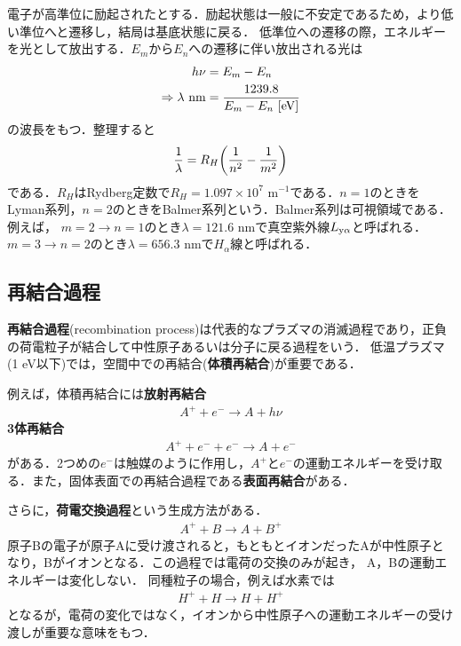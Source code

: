 \documentclass{report}
\begin{document}
      電子が高準位に励起されたとする．励起状態は一般に不安定であるため，より低い準位へと遷移し，結局は基底状態に戻る．
      低準位への遷移の際，エネルギーを光として放出する．$E_m$から$E_n$への遷移に伴い放出される光は
      \begin{align}
        h\nu &= E_m - E_n\\
        \Rightarrow \lambda\ \r{nm} &= \frac{1239.8}{E_m - E_n\ [\r{eV}]}
      \end{align}
      の波長をもつ．整理すると
      \begin{align}
        \frac{1}{\lambda} = R_H\qty(\frac{1}{n^2} - \frac{1}{m^2})
      \end{align}
      である．$R_H$はRydberg定数で$R_H = 1.097 \times 10^7$ m$^{-1}$である．$n=1$のときをLyman系列，$n=2$のときをBalmer系列という．Balmer系列は可視領域である．例えば，
      $m=2\to n=1$のとき$\lambda = 121.6$ nmで真空紫外線$L_{\mathrm{y\alpha}}$と呼ばれる．$m=3\to n=2$のとき$\lambda = 656.3$ nmで$H_{\alpha}$線と呼ばれる．

    \subsection{再結合過程}
      \textbf{再結合過程}(recombination process)は代表的なプラズマの消滅過程であり，正負の荷電粒子が結合して中性原子あるいは分子に戻る過程をいう．
      低温プラズマ(1 eV以下)では，空間中での再結合(\textbf{体積再結合})が重要である．

      例えば，体積再結合には\textbf{放射再結合}
      \begin{align}
        A^+ + e^- \rightarrow A + h\nu
      \end{align}
      \textbf{3体再結合}
      \begin{align}
        A^+ + e^- + e^- \rightarrow A + e^-
      \end{align}
      がある．2つめの$e^-$は触媒のように作用し，$A^+$と$e^-$の運動エネルギーを受け取る．また，固体表面での再結合過程である\textbf{表面再結合}がある．

      さらに，\textbf{荷電交換過程}という生成方法がある．
      \begin{align}
        A^+ + B \rightarrow A + B^+
      \end{align}
      原子Bの電子が原子Aに受け渡されると，もともとイオンだったAが中性原子となり，Bがイオンとなる．この過程では電荷の交換のみが起き，
      A，Bの運動エネルギーは変化しない．
      同種粒子の場合，例えば水素では
      \begin{align}
        H^+ + H \rightarrow H + H^+
      \end{align}
      となるが，電荷の変化ではなく，イオンから中性原子への運動エネルギーの受け渡しが重要な意味をもつ．
\end{document}
